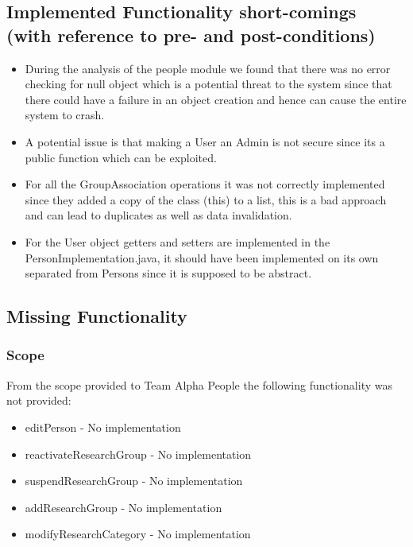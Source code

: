 \documentclass{article}
\begin{document}
    \subsection{Implemented Functionality short-comings (with reference to pre- and post-conditions)}
	\begin{itemize}
	
	    \item During the analysis of the people module we found that there was no error checking for null object which is a potential threat to the system since that there could have a failure in an object creation and hence can cause the entire system to crash.
	    \item A potential issue is that making a User an Admin is not secure since its a public function which can be exploited.
	    \item For all the GroupAssociation operations it was not correctly implemented since they added a copy of the class (this) to a list, this is a bad approach and can lead to duplicates as well as data invalidation.
	    \item For the User object getters and setters are implemented in the PersonImplementation.java, it should have been implemented on its own separated from Persons since it is supposed to be abstract. 

	\end{itemize}

    \subsection{Missing Functionality}
	\subsubsection{Scope}
	From the scope provided to Team Alpha People the following functionality was not provided:
	\begin{itemize}
		\item editPerson - No implementation
		\item reactivateResearchGroup - No implementation
		\item suspendResearchGroup - No implementation
		\item addResearchGroup - No implementation
		\item modifyResearchCategory - No implementation
	\end{itemize}
	
\end{document}
